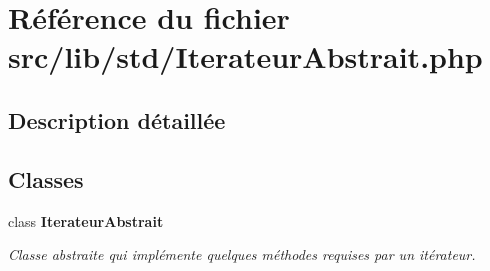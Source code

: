 \section{Référence du fichier src/lib/std/IterateurAbstrait.php}
\label{_iterateur_abstrait_8php}


\subsection{Description détaillée}


\subsection*{Classes}
\begin{CompactItemize}
\item 
class {\bf IterateurAbstrait}
\begin{CompactList}\small\item\em Classe abstraite qui implémente quelques méthodes requises par un itérateur. \item\end{CompactList}\end{CompactItemize}
